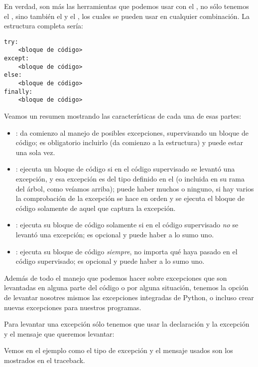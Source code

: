 
En verdad, son más las herramientas que podemos usar con el , no sólo tenemos el , sino también el  y el , los cuales se pueden usar en cualquier combinación. La estructura completa sería:

\begin{verbatim}
try:
    <bloque de código>
except:
    <bloque de código>
else:
    <bloque de código>
finally:
    <bloque de código>
\end{verbatim}

Veamos un resumen mostrando las características de cada una de esas partes:

\begin{itemize}
 \item {}: da comienzo al manejo de posibles excepciones, supervisando un bloque de código; es obligatorio incluirlo (da comienzo a la estructura) y puede estar una sola vez.
 \item {}: ejecuta un bloque de código si en el código supervisado se levantó una excepción, y esa excepción es del tipo definido en el  (o incluida en su rama del árbol, como veíamos arriba); puede haber muchos o ninguno, si hay varios la comprobación de la excepción se hace en orden y se ejecuta el bloque de código solamente de aquel que captura la excepción.
 \item {}: ejecuta su bloque de código solamente si en el código supervisado \textit{no} se levantó una excepción; es opcional y puede haber a lo sumo uno.
 \item {}: ejecuta su bloque de código \textit{siempre}, no importa qué haya pasado en el código supervisado; es opcional y puede haber a lo sumo uno.
\end{itemize}

Además de todo el manejo que podemos hacer sobre excepciones que son levantadas en alguna parte del código o por alguna situación, tenemos la opción de levantar nosotres mismos las excepciones integradas de Python, o incluso crear nuevas excepciones para nuestros programas.

Para levantar una excepción sólo tenemos que usar la declaración  y la excepción y el mensaje que queremos levantar:


Vemos en el ejemplo como el tipo de excepción y el mensaje usados son los mostrados en el traceback.

